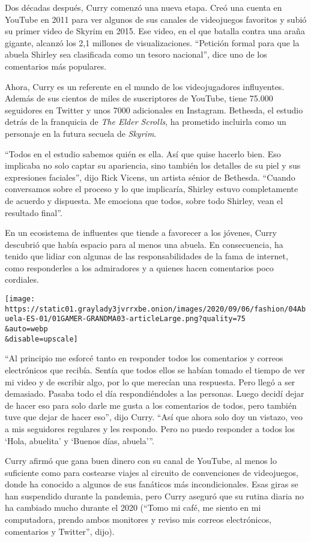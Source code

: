 Dos décadas después, Curry comenzó una nueva etapa. Creó una cuenta en
YouTube en 2011 para ver algunos de sus canales de videojuegos favoritos
y subió su primer video de Skyrim en 2015. Ese video, en el que batalla
contra una araña gigante, alcanzó los 2,1 millones de visualizaciones.
``Petición formal para que la abuela Shirley sea clasificada como un
tesoro nacional'', dice uno de los comentarios más populares.

Ahora, Curry es un referente en el mundo de los videojugadores
influyentes. Además de sus cientos de miles de suscriptores de YouTube,
tiene 75.000 seguidores en Twitter y unos 7000 adicionales en Instagram.
Bethesda, el estudio detrás de la franquicia de \emph{The Elder
Scrolls}, ha prometido incluirla como un personaje en la futura secuela
de \emph{Skyrim}.

``Todos en el estudio sabemos quién es ella. Así que quise hacerlo bien.
Eso implicaba no solo captar su apariencia, sino también los detalles de
su piel y sus expresiones faciales'', dijo Rick Vicens, un artista
sénior de Bethesda. ``Cuando conversamos sobre el proceso y lo que
implicaría, Shirley estuvo completamente de acuerdo y dispuesta. Me
emociona que todos, sobre todo Shirley, vean el resultado final''.

En un ecosistema de influentes que tiende a favorecer a los jóvenes,
Curry descubrió que había espacio para al menos una abuela. En
consecuencia, ha tenido que lidiar con algunas de las responsabilidades
de la fama de internet, como responderles a los admiradores y a quienes
hacen comentarios poco cordiales.

\texttt{[image: https://static01.graylady3jvrrxbe.onion/images/2020/09/06/fashion/04Abuela-ES-01/01GAMER-GRANDMA03-articleLarge.png?quality=75\\\&auto=webp\\\&disable=upscale]}

``Al principio me esforcé tanto en responder todos los comentarios y
correos electrónicos que recibía. Sentía que todos ellos se habían
tomado el tiempo de ver mi video y de escribir algo, por lo que merecían
una respuesta. Pero llegó a ser demasiado. Pasaba todo el día
respondiéndoles a las personas. Luego decidí dejar de hacer eso para
solo darle me gusta a los comentarios de todos, pero también tuve que
dejar de hacer eso'', dijo Curry. ``Así que ahora solo doy un vistazo,
veo a mis seguidores regulares y les respondo. Pero no puedo responder a
todos los `Hola, abuelita' y `Buenos días, abuela'''.

Curry afirmó que gana buen dinero con su canal de YouTube, al menos lo
suficiente como para costearse viajes al circuito de convenciones de
videojuegos, donde ha conocido a algunos de sus fanáticos más
incondicionales. Esas giras se han suspendido durante la pandemia, pero
Curry aseguró que su rutina diaria no ha cambiado mucho durante el 2020
(``Tomo mi café, me siento en mi computadora, prendo ambos monitores y
reviso mis correos electrónicos, comentarios y Twitter'', dijo).

